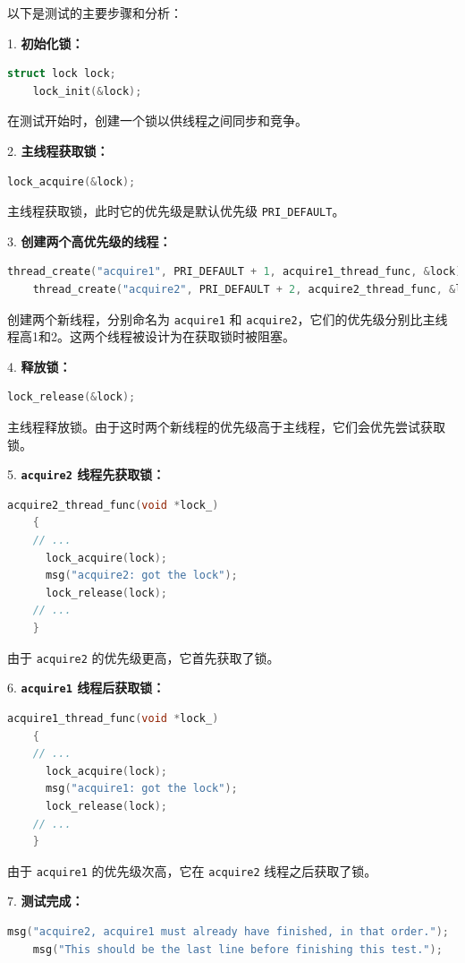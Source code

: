 \documentclass{article}
\begin{document}
以下是测试的主要步骤和分析：

1. \textbf{初始化锁：}
\begin{lstlisting}[language=C]
    struct lock lock;
    lock_init(&lock);
\end{lstlisting}

在测试开始时，创建一个锁以供线程之间同步和竞争。

2. \textbf{主线程获取锁：}
\begin{lstlisting}[language=C]
    lock_acquire(&lock);    
\end{lstlisting}

主线程获取锁，此时它的优先级是默认优先级 \texttt{PRI\_DEFAULT}。

3. \textbf{创建两个高优先级的线程：}
\begin{lstlisting}[language=C]
    thread_create("acquire1", PRI_DEFAULT + 1, acquire1_thread_func, &lock);
    thread_create("acquire2", PRI_DEFAULT + 2, acquire2_thread_func, &lock);
\end{lstlisting}

创建两个新线程，分别命名为 \texttt{acquire1} 和 \texttt{acquire2}，它们的优先级分别比主线程高1和2。这两个线程被设计为在获取锁时被阻塞。

4. \textbf{释放锁：}
\begin{lstlisting}[language=C]
    lock_release(&lock);
\end{lstlisting}

主线程释放锁。由于这时两个新线程的优先级高于主线程，它们会优先尝试获取锁。

5. \textbf{\texttt{acquire2} 线程先获取锁：}
\begin{lstlisting}[language=C]
    acquire2_thread_func(void *lock_) 
    {
    // ...
      lock_acquire(lock);
      msg("acquire2: got the lock");
      lock_release(lock);
    // ...
    }
\end{lstlisting}

由于 \texttt{acquire2} 的优先级更高，它首先获取了锁。

6. \textbf{\texttt{acquire1} 线程后获取锁：}
\begin{lstlisting}[language=C]
    acquire1_thread_func(void *lock_) 
    {
    // ...
      lock_acquire(lock);
      msg("acquire1: got the lock");
      lock_release(lock);
    // ...
    }
\end{lstlisting}

由于 \texttt{acquire1} 的优先级次高，它在 \texttt{acquire2} 线程之后获取了锁。

7. \textbf{测试完成：}
\begin{lstlisting}[language=C]
    msg("acquire2, acquire1 must already have finished, in that order.");
    msg("This should be the last line before finishing this test.");
\end{lstlisting}
\end{document}
